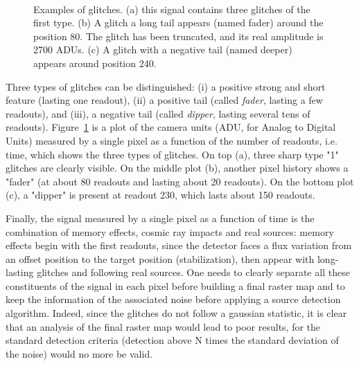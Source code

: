 \begin{figure}[htb]
\centerline{
\hbox{
}}
\caption{Examples of glitches. (a) this signal contains three 
glitches of 
the first type. (b) A glitch a long tail appears (named fader)  
around the position 80. The
glitch has been truncated, and its real amplitude is 2700 ADUs. (c) A 
glitch
with a negative tail (named deeper) appears around position 240.}
\label{fig_glitch3}
\end{figure}
Three types of glitches can be distinguished: (i) a positive strong and short feature (lasting one readout), 
(ii) a positive tail (called {\em fader}, lasting a few readouts),
and (iii), a negative tail (called {\em dipper}, lasting  several tens of readouts).  
Figure~\ref{fig_glitch3} is 
a plot of the camera units (ADU, for Analog to Digital Units) measured 
by a single pixel as a function of the number of readouts, i.e.  time, 
which shows the three types of glitches.  On top (a), three sharp type "1" 
glitches are clearly visible. On the middle plot (b), another pixel 
history shows a "fader" (at about 80 readouts and lasting about 20 
readouts). On the bottom plot (c), a "dipper" is present at  readout 
230, which lasts about 150 readouts.

Finally, the signal measured by a single pixel as a function of time 
is the combination of memory effects, cosmic ray impacts and real 
sources: memory effects begin with the first readouts, since the 
detector faces a flux variation from an offset position to the target 
position (stabilization), then appear with long-lasting glitches and 
following real sources.  One needs to clearly separate all these 
constituents of the signal in each pixel before building a final 
raster map and to keep the information of the associated noise before 
applying a source detection algorithm.  Indeed, since the glitches do 
not follow a gaussian statistic, it is clear that an analysis of the 
final raster map would lead to poor results, for the standard 
detection criteria (detection above N times the standard deviation of 
the noise) would no more be valid. \\

